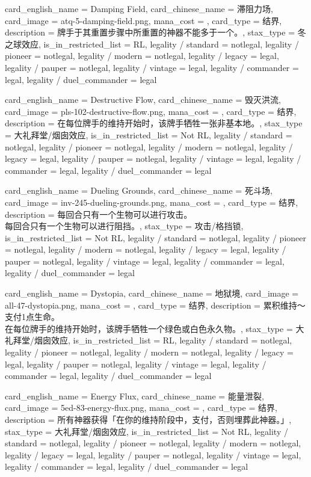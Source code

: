 \documentclass[lang = cn, color = black, 10pt]{AllThatStax}
\begin{document}
\card
{
	card_english_name = {Damping Field},
	card_chinese_name = {滞阻力场},
	card_image = atq-5-damping-field.png,
	mana_cost = ,
	card_type = 结界,
	description = {牌手于其重置步骤中所重置的神器不能多于一个。},
	stax_type = 冬之球效应,
	is_in_restricted_list = RL,
	legality / standard = notlegal,
	legality / pioneer = notlegal,
	legality / modern = notlegal,
	legality / legacy = legal,
	legality / pauper = notlegal,
	legality / vintage = legal,
	legality / commander = legal,
	legality / duel_commander = legal
}

\card
{
	card_english_name = {Destructive Flow},
	card_chinese_name = {毁灭洪流},
	card_image = pls-102-destructive-flow.png,
	mana_cost = ,
	card_type = 结界,
	description = {在每位牌手的维持开始时，该牌手牺牲一张非基本地。},
	stax_type = 大礼拜堂/烟囱效应,
	is_in_restricted_list = Not RL,
	legality / standard = notlegal,
	legality / pioneer = notlegal,
	legality / modern = notlegal,
	legality / legacy = legal,
	legality / pauper = notlegal,
	legality / vintage = legal,
	legality / commander = legal,
	legality / duel_commander = legal
}

\card
{
	card_english_name = {Dueling Grounds},
	card_chinese_name = {死斗场},
	card_image = inv-245-dueling-grounds.png,
	mana_cost = ,
	card_type = 结界,
	description = {每回合只有一个生物可以进行攻击。\\
每回合只有一个生物可以进行阻挡。},
	stax_type = 攻击/格挡锁,
	is_in_restricted_list = Not RL,
	legality / standard = notlegal,
	legality / pioneer = notlegal,
	legality / modern = notlegal,
	legality / legacy = legal,
	legality / pauper = notlegal,
	legality / vintage = legal,
	legality / commander = legal,
	legality / duel_commander = legal
}

\card
{
	card_english_name = {Dystopia},
	card_chinese_name = {地狱境},
	card_image = all-47-dystopia.png,
	mana_cost = ,
	card_type = 结界,
	description = {累积维持～支付1点生命。\\
在每位牌手的维持开始时，该牌手牺牲一个绿色或白色永久物。},
	stax_type = 大礼拜堂/烟囱效应,
	is_in_restricted_list = RL,
	legality / standard = notlegal,
	legality / pioneer = notlegal,
	legality / modern = notlegal,
	legality / legacy = legal,
	legality / pauper = notlegal,
	legality / vintage = legal,
	legality / commander = legal,
	legality / duel_commander = legal
}

\card
{
	card_english_name = {Energy Flux},
	card_chinese_name = {能量泄裂},
	card_image = 5ed-83-energy-flux.png,
	mana_cost = ,
	card_type = 结界,
	description = {所有神器获得「在你的维持阶段中，支付，否则埋葬此神器。」},
	stax_type = 大礼拜堂/烟囱效应,
	is_in_restricted_list = Not RL,
	legality / standard = notlegal,
	legality / pioneer = notlegal,
	legality / modern = notlegal,
	legality / legacy = legal,
	legality / pauper = notlegal,
	legality / vintage = legal,
	legality / commander = legal,
	legality / duel_commander = legal
}
\end{document}
